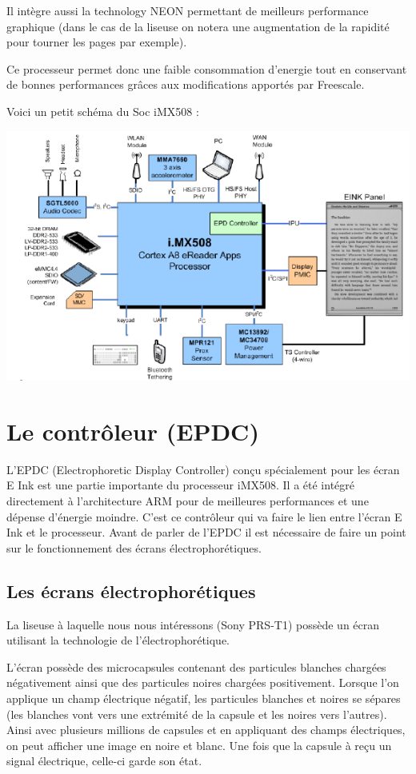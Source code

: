 Il intègre aussi la technology NEON permettant de meilleurs performance graphique (dans le cas de la liseuse on notera une augmentation de la rapidité pour tourner les pages par exemple).

Ce processeur permet donc une faible consommation d'energie tout en conservant de bonnes performances grâces aux modifications apportés par Freescale.


Voici un petit schéma du Soc iMX508 :

\begin{center}
	\includegraphics{iMX508.png}
\end{center}


\section{Le contrôleur (EPDC)}

L'EPDC (Electrophoretic Display Controller) conçu spécialement pour les écran E Ink  est une partie importante du processeur iMX508. Il a été intégré directement à l'architecture ARM pour de meilleures performances et une dépense d'énergie moindre. C'est ce contrôleur qui va faire le lien entre l'écran E Ink et le processeur.
Avant de parler de l'EPDC il est nécessaire de faire un point sur le fonctionnement des écrans électrophorétiques.

\subsection{Les écrans électrophorétiques}

La liseuse à laquelle nous nous intéressons (Sony PRS-T1) possède un écran utilisant la technologie de l'électrophorétique.

L'écran possède des microcapsules contenant des particules blanches chargées négativement ainsi que des particules noires chargées positivement. Lorsque l'on applique un champ électrique négatif, les particules blanches et noires se sépares (les blanches vont vers une extrémité de la capsule et les noires vers l'autres). Ainsi avec plusieurs millions de capsules et en appliquant des champs électriques, on peut afficher une image en noire et blanc. Une fois que la capsule à reçu un signal électrique, celle-ci garde son état.

